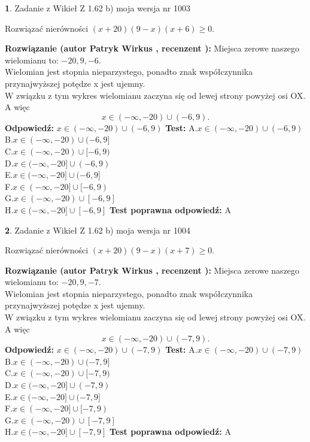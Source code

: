 \documentclass[12pt, a4paper]{article}
\theoremstyle{definition} %
\newtheorem{zad}{}
\newcommand{\zadStart}[1]{\begin{zad}#1\newline}
\newcommand{\zadStop}{\end{zad}}
\newcommand{\rozwStart}[2]{\noindent \textbf{Rozwiązanie (autor #1 , recenzent #2): }\newline}
\newcommand{\rozwStop}{\newline}
\newcommand{\odpStart}{\noindent \textbf{Odpowiedź:}\newline}
\newcommand{\odpStop}{\newline}
\newcommand{\testStart}{\noindent \textbf{Test:}\newline}
\newcommand{\testStop}{\newline}
\newcommand{\kluczStart}{\noindent \textbf{Test poprawna odpowiedź:}\newline}
\newcommand{\kluczStop}{\newline}
\begin{document}
\zadStart{Zadanie z Wikieł Z 1.62 b) moja wersja nr 1003}

Rozwiązać nierówności $(x+20)(9-x)(x+6)\ge0$.
\zadStop
\rozwStart{Patryk Wirkus}{}
Miejsca zerowe naszego wielomianu to: $-20, 9, -6$.\\
Wielomian jest stopnia nieparzystego, ponadto znak współczynnika przy\linebreak najwyższej potędze x jest ujemny.\\ W związku z tym wykres wielomianu zaczyna się od lewej strony powyżej osi OX. A więc $$x \in (-\infty,-20) \cup (-6,9).$$
\rozwStop
\odpStart
$x \in (-\infty,-20) \cup (-6,9)$
\odpStop
\testStart
A.$x \in (-\infty,-20) \cup (-6,9)$\\
B.$x \in (-\infty,-20) \cup (-6,9]$\\
C.$x \in (-\infty,-20) \cup [-6,9)$\\
D.$x \in (-\infty,-20] \cup (-6,9)$\\
E.$x \in (-\infty,-20] \cup (-6,9]$\\
F.$x \in (-\infty,-20] \cup [-6,9)$\\
G.$x \in (-\infty,-20) \cup [-6,9]$\\
H.$x \in (-\infty,-20] \cup [-6,9]$
\testStop
\kluczStart
A
\kluczStop



\zadStart{Zadanie z Wikieł Z 1.62 b) moja wersja nr 1004}

Rozwiązać nierówności $(x+20)(9-x)(x+7)\ge0$.
\zadStop
\rozwStart{Patryk Wirkus}{}
Miejsca zerowe naszego wielomianu to: $-20, 9, -7$.\\
Wielomian jest stopnia nieparzystego, ponadto znak współczynnika przy\linebreak najwyższej potędze x jest ujemny.\\ W związku z tym wykres wielomianu zaczyna się od lewej strony powyżej osi OX. A więc $$x \in (-\infty,-20) \cup (-7,9).$$
\rozwStop
\odpStart
$x \in (-\infty,-20) \cup (-7,9)$
\odpStop
\testStart
A.$x \in (-\infty,-20) \cup (-7,9)$\\
B.$x \in (-\infty,-20) \cup (-7,9]$\\
C.$x \in (-\infty,-20) \cup [-7,9)$\\
D.$x \in (-\infty,-20] \cup (-7,9)$\\
E.$x \in (-\infty,-20] \cup (-7,9]$\\
F.$x \in (-\infty,-20] \cup [-7,9)$\\
G.$x \in (-\infty,-20) \cup [-7,9]$\\
H.$x \in (-\infty,-20] \cup [-7,9]$
\testStop
\kluczStart
A
\kluczStop
\end{document}
